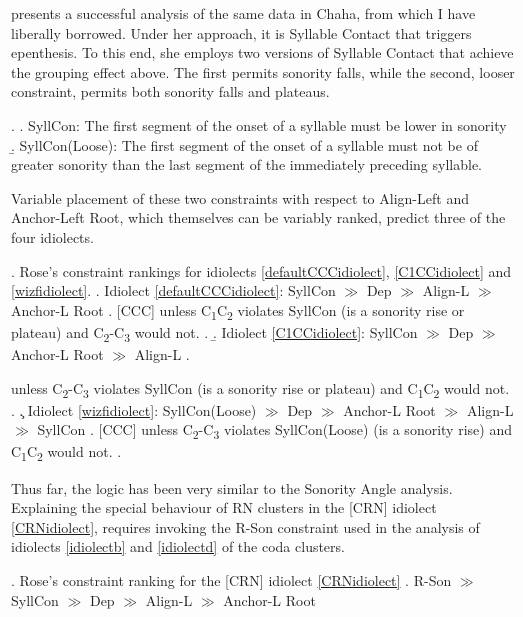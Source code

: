 \documentclass[12pt]{article}
\begin{document}
\citet{rose.2000} presents a successful analysis of the same data in Chaha, from which I have liberally borrowed. Under her approach, it is Syllable Contact that triggers epenthesis. To this end, she employs two versions of Syllable Contact that achieve the grouping effect above. The first permits sonority falls, while the second, looser constraint, permits both sonority falls and plateaus.

\ex. \a. {\sc SyllCon}: The first segment of the onset of a syllable must be lower in sonority 
     \b. {\sc SyllCon(Loose}): The first segment of the onset of a syllable must not be of greater sonority than the last segment of the immediately preceding syllable.

Variable placement of these two constraints with respect to {\sc Align-Left} and {\sc Anchor-Left Root}, which themselves can be variably ranked, predict three of the four idiolects.

\ex. Rose's constraint rankings for idiolects \ref{defaultCCCidiolect}, \ref{C1CCidiolect} and \ref{wizfidiolect}.
    \a. Idiolect \ref{defaultCCCidiolect}: {\sc SyllCon} $\gg$ {\sc Dep} $\gg$ {\sc Align-L} $\gg$ {\sc Anchor-L Root}
          \a. [CCC] unless C\textsubscript{1}C\textsubscript{2} violates {\sc SyllCon}
               (is a sonority rise or plateau) and C\textsubscript{2}-C\textsubscript{3} would not.
          \z.
     \b. Idiolect \ref{C1CCidiolect}: {\sc SyllCon} $\gg$ {\sc Dep} $\gg$ {\sc Anchor-L Root} $\gg$ {\sc Align-L} 
          \a. \item [C\textipa{1}CC] unless C\textsubscript{2}-C\textsubscript{3} violates {\sc SyllCon}
                (is a sonority rise or plateau) and C\textsubscript{1}C\textsubscript{2} would not.
          \z.
     \c. Idiolect \ref{wizfidiolect}: {\sc SyllCon(Loose)} $\gg$ {\sc Dep} $\gg$ {\sc Anchor-L Root} $\gg$ {\sc Align-L} $\gg$ {\sc SyllCon}
          \a. [CCC] unless C\textsubscript{2}-C\textsubscript{3} violates {\sc SyllCon(Loose)} 
                (is a sonority rise) and C\textsubscript{1}C\textsubscript{2} would not.
          \z.

Thus far, the logic has been very similar to the {\sc Sonority Angle} analysis. Explaining the special behaviour of RN clusters in the [CRN] idiolect \ref{CRNidiolect}, requires invoking the {\sc *R-Son} constraint used in the analysis of idiolects \ref{idiolectb} and \ref{idiolectd} of the coda clusters.

\ex. Rose's constraint ranking for the [CRN] idiolect \ref{CRNidiolect}
     \a. {\sc *R-Son} $\gg$ {\sc SyllCon} $\gg$ {\sc Dep} $\gg$ {\sc Align-L} $\gg$ {\sc Anchor-L Root}
\end{document}
